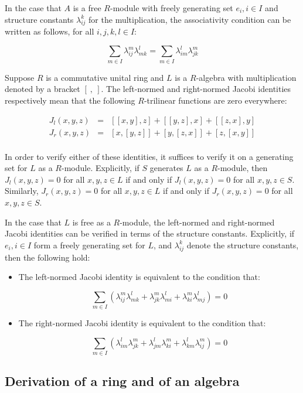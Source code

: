 In the case that $A$ is a free $R$-module with freely generating set
$e_i, i \in I$ and structure constants $\lambda_{ij}^k$ for the
multiplication, the associativity condition can be written as follows,
for all $i,j,k,l \in I$:

$$\sum_{m \in I} \lambda_{ij}^m\lambda_{mk}^l = \sum_{m \in I} \lambda_{im}^l \lambda_{jk}^m$$

Suppose $R$ is a commutative unital ring and $L$ is a $R$-algebra with
multiplication denoted by a bracket $[ \ , \ ]$. The left-normed and
right-normed Jacobi identities respectively mean that the following
$R$-trilinear functions are zero everywhere:

\begin{eqnarray*}
  J_l(x,y,z) & = & [[x,y],z] + [[y,z],x] + [[z,x],y]\\
  J_r(x,y,z) & = & [x,[y,z]] + [y,[z,x]] + [z,[x,y]]\\
\end{eqnarray*}

In order to verify either of these identities, it suffices to verify
it on a generating set for $L$ as a $R$-module. Explicitly, if $S$
generates $L$ as a $R$-module, then $J_l(x,y,z) = 0$ for all $x,y,z
\in L$ if and only if $J_l(x,y,z) = 0$ for all $x,y,z \in
S$. Similarly, $J_r(x,y,z) = 0$ for all $x,y,z \in L$ if and only if
$J_r(x,y,z) = 0$ for all $x,y,z \in S$.

In the case that $L$ is free as a $R$-module, the left-normed and
right-normed Jacobi identities can be verified in terms of the
structure constants. Explicitly, if $e_i, i \in I$ form a freely
generating set for $L$, and $\lambda_{ij}^k$ denote the structure
constants, then the following hold:

\begin{itemize}
\item The left-normed Jacobi identity is equivalent to the condition that:

  $$\sum_{m \in I} (\lambda_{ij}^m\lambda_{mk}^l + \lambda_{jk}^m\lambda_{mi}^l + \lambda_{ki}^m\lambda_{mj}^l) = 0$$

\item The right-normed Jacobi identity is equivalent to the condition
  that:

  $$\sum_{m \in I} (\lambda_{im}^l\lambda_{jk}^m + \lambda_{jm}^l\lambda_{ki}^m + \lambda_{km}^l\lambda_{ij}^m) = 0$$
\end{itemize}

\subsection{Derivation of a ring and of an algebra}\label{appsec:derivation}

